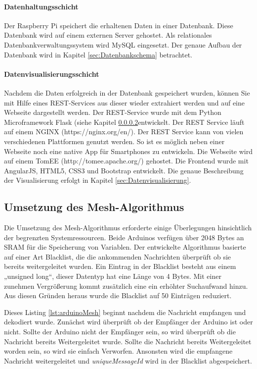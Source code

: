 \paragraph{Datenhaltungsschicht} Der Raspberry Pi speichert die erhaltenen Daten in einer Datenbank. Diese Datenbank wird auf einem externen Server gehostet. Als relationales Datenbankverwaltungssystem wird MySQL eingesetzt. Der genaue Aufbau der Datenbank wird in Kapitel \ref{sec:Datenbankschema} betrachtet.
\paragraph{Datenvisualisierungsschicht} Nachdem die Daten erfolgreich in der Datenbank gespeichert wurden, können Sie mit Hilfe eines REST-Services aus dieser wieder extrahiert werden und auf eine Webseite dargestellt werden. Der REST-Service wurde mit dem Python Microframework Flask (siehe Kapitel \ref{}entwickelt. Der REST Service läuft auf einem NGINX (https://nginx.org/en/). Der REST Service kann von vielen verschiedenen Plattformen genutzt werden. So ist es möglich neben einer Webseite noch eine native App für Smartphones zu entwickeln. Die Webseite wird auf einem TomEE (http://tomee.apache.org/) gehostet. Die Frontend wurde mit AngularJS, HTML5, CSS3 und Bootstrap entwickelt. Die genaue Beschreibung der Visualisierung erfolgt in Kapitel \ref{sec:Datenvisualisierung}.
\subsection{Umsetzung des Mesh-Algorithmus}
\label{sec:MeshAlgorithmus}
Die Umsetzung des Mesh-Algorithmus erforderte einige Überlegungen hinsichtlich der begrenzten Systemressourcen. Beide Arduinos verfügen über 2048 Bytes an SRAM für die Speicherung von Variablen. Der entwickelte Algorithmus basierte auf einer Art Blacklist, die die ankommenden Nachrichten überprüft ob sie bereits weitergeleitet wurden. Ein Eintrag in der Blacklist besteht aus einem „unsigned long“, dieser Datentyp hat eine Länge von 4 Bytes. Mit einer zunehmen Vergrößerung kommt zusätzlich eine ein erhöhter Suchaufwand hinzu. Aus diesen Gründen heraus wurde die Blacklist auf 50 Einträgen reduziert.


Dieses Listing \ref{lst:arduinoMesh} beginnt nachdem die Nachricht empfangen und dekodiert wurde. Zunächst wird überprüft ob der Empfänger der Arduino ist oder nicht. Sollte der Arduino nicht der Empfänger sein, so wird überprüft ob die Nachricht bereits Weitergeleitet wurde. Sollte die Nachricht bereits Weitergeleitet worden sein, so wird sie einfach Verworfen. Ansonsten wird die empfangene Nachricht weitergeleitet und \textit{uniqueMessageId} wird in der Blacklist abgespeichert. 
